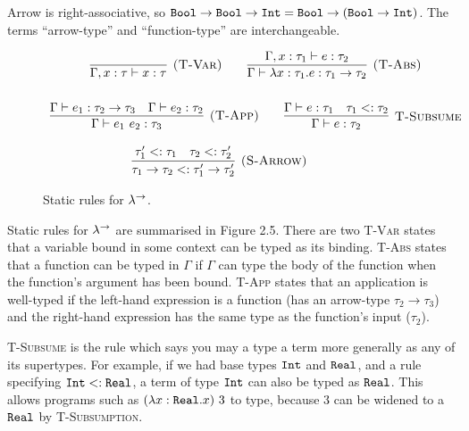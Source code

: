 Arrow is right-associative, so $\mathtt{Bool} \rightarrow \mathtt{Bool} \rightarrow \mathtt{Int} = \mathtt{Bool} \rightarrow (\mathtt{Bool} \rightarrow \mathtt{Int})$. The terms ``arrow-type'' and ``function-type'' are interchangeable. \\

\begin{figure}[h]


\[
\begin{array}{c}


\infer[\textsc{(T-Var)}]
	{\Gamma, x: \tau \vdash x: \tau}
	{}
	
~~~~~~
	
\infer[\textsc{(T-Abs)}]
	{\Gamma \vdash \lambda x: \tau_1.e : \tau_1 \rightarrow \tau_2}
	{\Gamma, x: \tau_1 \vdash e: \tau_2} \\[4ex]
	
	
\infer[\textsc{(T-App)}]
	{\Gamma \vdash e_1~e_2: \tau_3}
	{\Gamma \vdash e_1: \tau_2 \rightarrow \tau_3 & \Gamma \vdash e_2: \tau_2}
	~~~~~~
\infer[\textsc{T-Subsume}]
	{\Gamma \vdash e: \tau_2}
	{\Gamma \vdash e: \tau_1 & \tau_1 <: \tau_2 }

\end{array}
\]

	
\fbox{$\tau <: \tau$}

	
\[
\begin{array}{c}


\infer[\textsc{(S-Arrow)}]
	{\tau_1 \rightarrow \tau_2 <: \tau_1' \rightarrow \tau_2'}
	{\tau_1' <: \tau_1 & \tau_2 <: \tau_2'}

~~~~~~

\end{array}
\]

\vspace{-7pt}
\caption{Static rules for $\lambda^{\rightarrow}$.}
\label{This is the label.}
\end{figure}

Static rules for $\lambda^{\rightarrow}$ are summarised in Figure 2.5. There are two \textsc{T-Var} states that a variable bound in some context can be typed as its binding. \textsc{T-Abs} states that a function can be typed in $\Gamma$ if $\Gamma$ can type the body of the function when the function's argument has been bound. \textsc{T-App} states that an application is well-typed if the left-hand expression is a function (has an arrow-type $\tau_2 \rightarrow \tau_3$) and the right-hand expression has the same type as the function's input ($\tau_2$).

\textsc{T-Subsume} is the rule which says you may a type a term more generally as any of its supertypes. For example, if we had base types $\mathtt{Int}$ and $\mathtt{Real}$, and a rule specifying $\mathtt{Int} <: \mathtt{Real}$, a term of type $\mathtt{Int}$ can also be typed as $\mathtt{Real}$. This allows programs such as $(\lambda x: \mathtt{Real}. x)~3$ to type, because $3$ can be widened to a $\mathtt{Real}$ by \textsc{T-Subsumption}.

